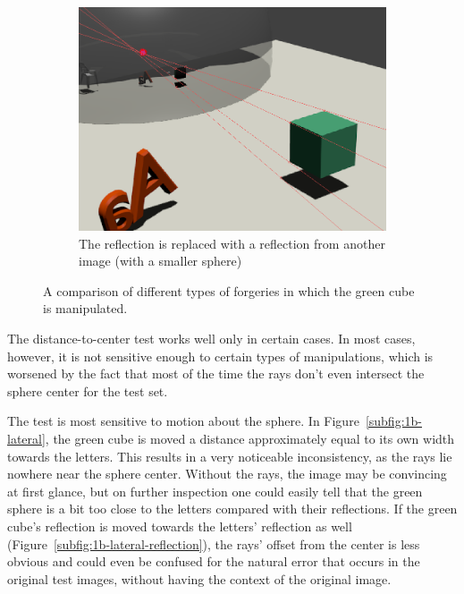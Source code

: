 \documentclass{thesis}
\begin{document}
\begin{figure}
    \begin{subfigure}{0.5\textwidth}
                \includegraphics[width=\textwidth]{1b-composite}
                \caption{The reflection is replaced with a reflection from another image (with a smaller sphere)}
                \label{subfig:1b-composite}
    \end{subfigure}
    \caption{A comparison of different types of forgeries in which the green cube is manipulated.}
	\label{forgery-comparison}
\end{figure}

The distance-to-center test works well only in certain cases. In most cases, however, it is not sensitive enough to certain types of manipulations, which is worsened by the fact that most of the time the rays don't even intersect the sphere center for the test set.

The test is most sensitive to motion about the sphere. In Figure~\ref{subfig:1b-lateral}, the green cube is moved a distance approximately equal to its own width towards the letters. This results in a very noticeable inconsistency, as the rays lie nowhere near the sphere center. Without the rays, the image may be convincing at first glance, but on further inspection one could easily tell that the green sphere is a bit too close to the letters compared with their reflections. If the green cube's reflection is moved towards the letters' reflection as well (Figure~\ref{subfig:1b-lateral-reflection}), the rays' offset from the center is less obvious and could even be confused for the natural error that occurs in the original test images, without having the context of the original image.
\end{document}
